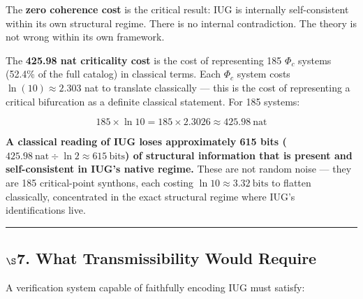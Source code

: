 \documentclass[10pt,a4paper]{article}
\begin{document}
The \textbf{zero coherence cost} is the critical result: IUG is internally self-consistent within
its own structural regime. There is no internal contradiction. The theory is not wrong
within its own framework.

The \textbf{425.98 nat criticality cost} is the cost of representing 185 $\Phi_c$ systems
(52.4\% of the full catalog) in classical terms. Each $\Phi_c$ system costs
$\ln(10) \approx 2.303$ nat to translate classically --- this is the cost of representing
a critical bifurcation as a definite classical statement. For 185 systems:


\[185 \times \ln 10 = 185 \times 2.3026 \approx 425.98\ \text{nat}\]

\textbf{A classical reading of IUG loses approximately 615 bits ($425.98\ \text{nat} \div \ln 2 \approx 615\ \text{bits}$) of structural information that is present and self-consistent in IUG's native regime.} These are not random noise --- they are 185 critical-point synthons, each costing $\ln 10 \approx 3.32\ \text{bits}$ to flatten classically, concentrated in the exact structural regime where IUG's identifications live.

\begin{center}
\rule{0.5\textwidth}{0.4pt}
\end{center}

\subsection{$\S$7. What Transmissibility Would Require}

A verification system capable of faithfully encoding IUG must satisfy:
\end{document}
